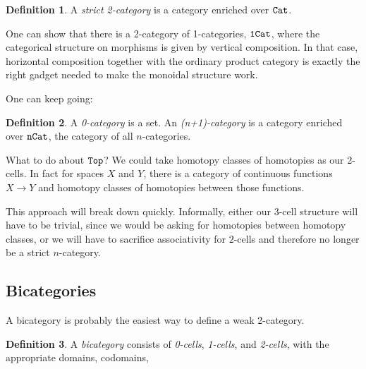 \documentclass[11 pt]{amsart}
\theoremstyle{plain}   %
\theoremstyle{definition}
\newtheorem{defn}{Definition}[section]
\theoremstyle{remark}
\numberwithin{equation}{section}
\newcommand{\cat}[1]{{\normalfont\texttt{#1}}}
\begin{document}
\begin{defn}
	A \emph{strict 2-category} is a category enriched over $\cat{Cat}$.
\end{defn}

One can show that there is a 2-category of 1-categories, $\cat{1Cat}$, where the
categorical structure on morphisms is given by vertical composition. In that
case, horizontal composition together with the ordinary product category is
exactly the right gadget needed to make the monoidal structure work.

One can keep going:

\begin{defn} A \emph{0-category} is a set. An \emph{(n+1)-category} is a category
	enriched over $\cat{nCat}$, the category of all $n$-categories.
\end{defn}

What to do about $\cat{Top}$? We could take homotopy classes of homotopies as
our 2-cells. In fact for spaces $X$ and $Y$, there is a category of continuous
functions $X\rightarrow Y$ and homotopy classes of homotopies between those
functions.

This approach will break down quickly. Informally, either our $3$-cell structure
will have to be trivial, since we would be asking for homotopies between
homotopy classes, or we will have to sacrifice associativity for $2$-cells and
therefore no longer be a strict $n$-category.

\subsection{Bicategories}

A bicategory is probably the easiest way to define a weak 2-category.

\begin{defn}
	A \emph{bicategory} consists of \emph{0-cells}, \emph{1-cells}, and
	\emph{2-cells}, with the appropriate domains, codomains,
\end{defn}




\end{document}
